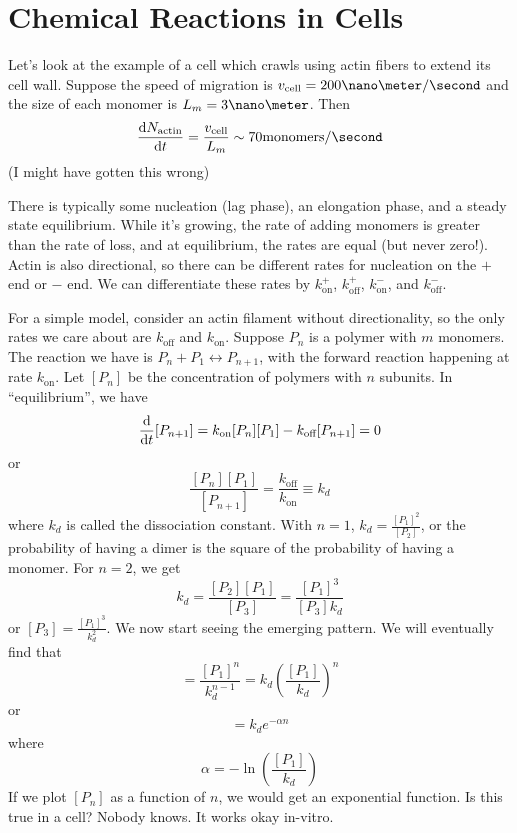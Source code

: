 \documentclass[a4paper,twoside,master.tex]{subfiles}
\begin{document}
\chapter{Chemical Reactions in Cells}

Let's look at the example of a cell which crawls using actin fibers to extend its cell wall. Suppose the speed of migration is $ v_{\text{cell}} = 200 \nano\meter/\second $ and the size of each monomer is $ L_m = 3\nano\meter $. Then
\begin{equation}
    \dv{N_{\text{actin}}}{t} = \frac{v_{\text{cell}}}{L_m} \sim 70 \text{monomers}/\second
\end{equation} (I might have gotten this wrong)

There is typically some nucleation (lag phase), an elongation phase, and a steady state equilibrium. While it's growing, the rate of adding monomers is greater than the rate of loss, and at equilibrium, the rates are equal (but never zero!). Actin is also directional, so there can be different rates for nucleation on the $ + $ end or $ - $ end. We can differentiate these rates by $ k^+_{\text{on}} $, $ k^+_{\text{off}} $, $ k^-_{\text{on}} $, and $ k^-_{\text{off}} $.

For a simple model, consider an actin filament without directionality, so the only rates we care about are $ k_{\text{off}} $ and $ k_{\text{on}} $. Suppose $ P_n $ is a polymer with $ m $ monomers. The reaction we have is $ P_n + P_1 \leftrightarrow P_{n+1} $, with the forward reaction happening at rate $ k_{\text{on}} $. Let $ [P_n] $ be the concentration of polymers with $ n $ subunits. In ``equilibrium'', we have
\begin{equation}
    \dv{t}[P_{n+1}] = k_{\text{on}} [P_n][P_1] - k_{\text{off}} [P_{n+1}] = 0
\end{equation}
or
\begin{equation}
    \frac{[P_n][P_1]}{[P_{n+1}]} = \frac{k_{\text{off}}}{k_{\text{on}}} \equiv k_d
\end{equation}
where $ k_d $ is called the dissociation constant. With $ n = 1 $, $ k_d = \frac{[P_1]^2}{[P_2]} $, or the probability of having a dimer is the square of the probability of having a monomer. For $ n = 2 $, we get
\begin{equation}
    k_d = \frac{[P_2][P_1]}{[P_3]} = \frac{[P_1]^3}{[P_3] k_d}
\end{equation}
or $ [P_3] = \frac{[P_1]^3}{k_d^2} $. We now start seeing the emerging pattern. We will eventually find that
\begin{equation}
    [P_n] = \frac{[P_1]^n}{k_d^{n-1}} = k_d \left( \frac{[P_1]}{k_d} \right)^n
\end{equation}
or
\begin{equation}
    [P_n] = k_d e^{- \alpha n}
\end{equation}
where
\begin{equation}
    \alpha = - \ln(\frac{[P_1]}{k_d})
\end{equation}
If we plot $ [P_n] $ as a function of $ n $, we would get an exponential function. Is this true in a cell? Nobody knows. It works okay in-vitro.
\end{document}
